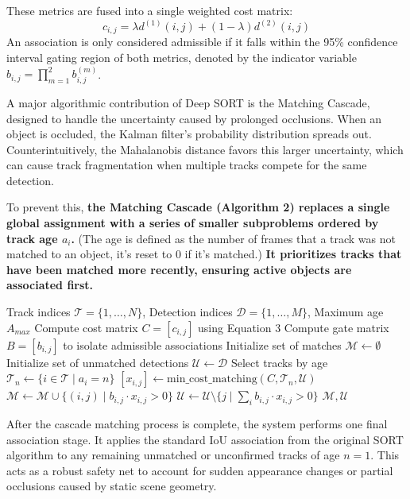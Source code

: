 \documentclass[10pt,twocolumn,letterpaper]{article}
\begin{document}
These metrics are fused into a single weighted cost matrix:
\begin{equation}
    c_{i,j} = \lambda d^{(1)}(i,j) + (1-\lambda)d^{(2)}(i,j)
\end{equation}
An association is only considered admissible if it falls within the 95\% confidence interval gating region of both metrics, denoted by the indicator variable $b_{i,j} = \prod_{m=1}^{2} b_{i,j}^{(m)}$.

A major algorithmic contribution of Deep SORT is the Matching Cascade, designed to handle the uncertainty caused by prolonged occlusions. When an object is occluded, the Kalman filter's probability distribution spreads out. Counterintuitively, the Mahalanobis distance favors this larger uncertainty, which can cause track fragmentation when multiple tracks compete for the same detection. 

To prevent this, \textbf{the Matching Cascade (Algorithm 2) replaces a single global assignment with a series of smaller subproblems ordered by track age $a_i$.} (The age is defined as the number of frames that a track was not matched to an object, it's reset to 0 if it's matched.) \textbf{It prioritizes tracks that have been matched more recently, ensuring active objects are associated first.}

\begin{algorithm}[H]
\caption{Matching Cascade}
\begin{algorithmic}[1]
\Require Track indices $\mathcal{T} = \{1, \dots, N\}$, Detection indices $\mathcal{D} = \{1, \dots, M\}$, Maximum age $A_{max}$
\State Compute cost matrix $C = [c_{i,j}]$ using Equation 3
\State Compute gate matrix $B = [b_{i,j}]$ to isolate admissible associations
\State Initialize set of matches $\mathcal{M} \gets \emptyset$
\State Initialize set of unmatched detections $\mathcal{U} \gets \mathcal{D}$
    \State Select tracks by age $\mathcal{T}_n \gets \{i \in \mathcal{T} \mid a_i = n\}$
    \State $[x_{i,j}] \gets \text{min\_cost\_matching}(C, \mathcal{T}_n, \mathcal{U})$
    \State $\mathcal{M} \gets \mathcal{M} \cup \{(i, j) \mid b_{i,j} \cdot x_{i,j} > 0\}$
    \State $\mathcal{U} \gets \mathcal{U} \setminus \{j \mid \sum_i b_{i,j} \cdot x_{i,j} > 0\}$
\EndFor
\State \Return $\mathcal{M}, \mathcal{U}$
\end{algorithmic}
\end{algorithm}

After the cascade matching process is complete, the system performs one final association stage. It applies the standard IoU association from the original SORT algorithm to any remaining unmatched or unconfirmed tracks of age $n=1$. This acts as a robust safety net to account for sudden appearance changes or partial occlusions caused by static scene geometry.
\end{document}
